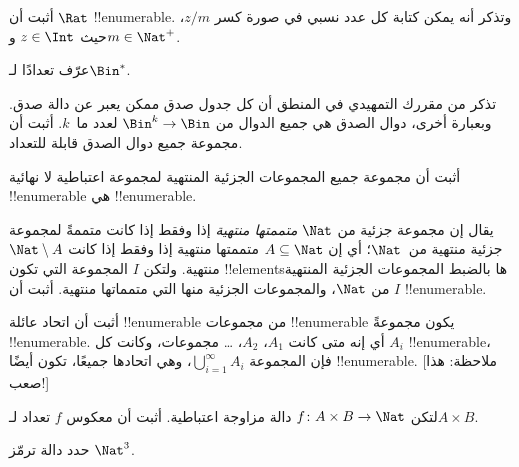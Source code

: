\documentclass[../../../include/open-logic-section]{subfiles}
\begin{document}
\begin{prob}
أثبت أن $\Rat$ !!{enumerable}. وتذكر أنه يمكن كتابة كل عدد نسبي
في صورة كسر $z/m$، حيث $z \in \Int$ و$m \in \Nat^+$.
\end{prob}

\begin{prob}
عرّف تعدادًا لـ$\Bin^*$.
\end{prob}

\begin{prob}
تذكر من مقررك التمهيدي في المنطق أن كل جدول صدق ممكن يعبر عن دالة
صدق. وبعبارة أخرى، دوال الصدق هي جميع الدوال من $\Bin^k \to \Bin$
لعدد ما~$k$. أثبت أن مجموعة جميع دوال الصدق قابلة للتعداد.
\end{prob}

\begin{prob}
أثبت أن مجموعة جميع المجموعات الجزئية المنتهية لمجموعة اعتباطية لا
نهائية !!{enumerable} هي !!{enumerable}.
\end{prob}

\begin{prob}
يقال إن مجموعة جزئية من $\Nat$ \emph{متممتها منتهية} إذا وفقط إذا
كانت متممةً لمجموعة جزئية منتهية من~$\Nat$؛ أي إن $A \subseteq \Nat$ متممتها
منتهية إذا وفقط إذا كانت $\Nat\setminus A$ منتهية. ولتكن $I$ المجموعة
التي تكون !!{element}sها بالضبط المجموعات الجزئية المنتهية من
$\Nat$، والمجموعات الجزئية منها التي متمماتها منتهية. أثبت أن $I$
!!{enumerable}.
\end{prob}

\begin{prob}
أثبت أن اتحاد عائلة !!{enumerable} من مجموعات !!{enumerable} يكون
مجموعةً !!{enumerable}. أي إنه متى كانت $A_1$، $A_2$، \dots{} مجموعات،
وكانت كل $A_i$ !!{enumerable}، فإن المجموعة
$\bigcup_{i=1}^\infty
A_i$، وهي اتحادها جميعًا، تكون أيضًا !!{enumerable}. [ملاحظة: هذا صعب!]
\end{prob}

\begin{prob}
لتكن $f \colon A \times B \to \Nat$ دالة مزاوجة اعتباطية. أثبت أن
معكوس $f$ تعداد لـ$A \times B$.
\end{prob}

\begin{prob}
حدد دالة ترمّز $\Nat^3$.
\end{prob}
\end{document}

